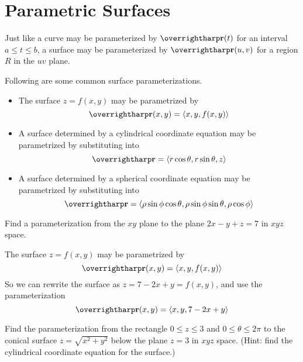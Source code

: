 \documentclass[letterpaper, twoside, 12pt]{book}
\begin{document}
\section{Parametric Surfaces} %

\begin{remark}
  Just like a curve may be parameterized by $\vect{r}(t)$
  for an interval $a\leq t\leq b$, a surface may be parameterized by
  $\vect{r}(u,v)$ for a region $R$ in the $uv$ plane.
\end{remark}

\begin{theorem}
  Following are some common surface parameterizations.
  \begin{itemize}
    \item The surface $z=f(x,y)$ may be parametrized by
      \[
        \vect{r}(x,y) = \<x,y,f(x,y)\>
      \]
    \item A surface determined by a cylindrical coordinate equation may
    be parametrized by substituting into
      \[
        \vect{r} = \<r\cos\theta, r\sin\theta, z\>
      \]
    \item A surface determined by a spherical coordinate equation may
    be parametrized by substituting into
      \[
        \vect{r} =
        \<\rho\sin\phi\cos\theta,
        \rho\sin\phi\sin\theta,
        \rho\cos\phi \>
      \]
  \end{itemize}
\end{theorem}

          \begin{problem}
            Find a parameterization from the $xy$ plane to the
            plane $2x-y+z=7$ in $xyz$ space.
          \end{problem}

          \begin{solution}
            The surface $z=f(x,y)$ may be parametrized by
              \[
                \vect{r}(x,y) = \<x,y,f(x,y)\>
              \]
            So we can rewrite the surface as $z=7-2x+y=f(x,y)$, and use the
            parameterization
              \[
                \vect{r}(x,y) = \<x,y,7-2x+y\>
              \]
          \end{solution}

          \begin{problem}
            Find the parameterization from the rectangle $0\leq z\leq 3$
            and $0\leq\theta\leq2\pi$ to the conical surface $z=\sqrt{x^2+y^2}$
            below the plane $z=3$ in $xyz$ space. (Hint: find the cylindrical
            coordinate equation for the surface.)
          \end{problem}
\end{document}
